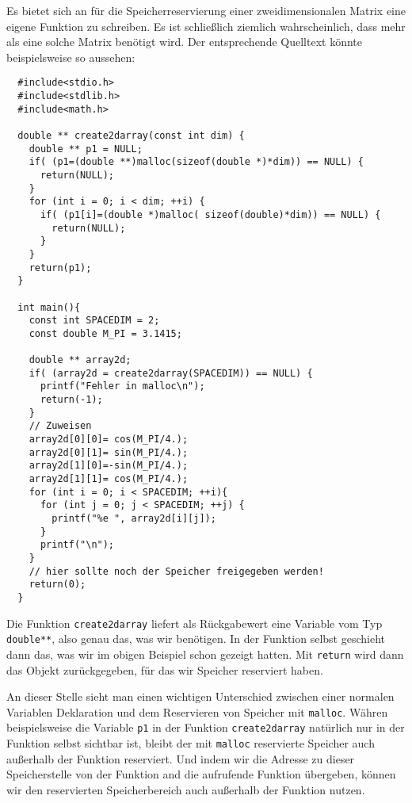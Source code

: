 Es bietet sich an für die Speicherreservierung einer zweidimensionalen Matrix eine eigene Funktion zu schreiben.
Es ist schließlich ziemlich wahrscheinlich, dass mehr als eine solche Matrix benötigt wird.
Der entsprechende Quelltext könnte beispielsweise so aussehen:
\begin{lstlisting}
  #include<stdio.h>
  #include<stdlib.h>
  #include<math.h>
  
  double ** create2darray(const int dim) {
    double ** p1 = NULL;
    if( (p1=(double **)malloc(sizeof(double *)*dim)) == NULL) {
      return(NULL);
    }
    for (int i = 0; i < dim; ++i) {
      if( (p1[i]=(double *)malloc( sizeof(double)*dim)) == NULL) {
        return(NULL);
      }
    }
    return(p1);
  }
  
  int main(){
    const int SPACEDIM = 2;
    const double M_PI = 3.1415;
    
    double ** array2d;
    if( (array2d = create2darray(SPACEDIM)) == NULL) {
      printf("Fehler in malloc\n");
      return(-1);
    }
    // Zuweisen
    array2d[0][0]= cos(M_PI/4.); 
    array2d[0][1]= sin(M_PI/4.); 
    array2d[1][0]=-sin(M_PI/4.); 
    array2d[1][1]= cos(M_PI/4.); 
    for (int i = 0; i < SPACEDIM; ++i){
      for (int j = 0; j < SPACEDIM; ++j) {
        printf("%e ", array2d[i][j]);
      }
      printf("\n");
    }
    // hier sollte noch der Speicher freigegeben werden!
    return(0);
  }
\end{lstlisting}
Die Funktion \verb|create2darray| liefert als Rückgabewert eine Variable vom Typ \verb|double**|, also genau das, was wir benötigen.
In der Funktion selbst geschieht dann das, was wir im obigen Beispiel schon gezeigt hatten.
Mit \verb|return| wird dann das Objekt zurückgegeben, für das wir Speicher reserviert haben.

An dieser Stelle sieht man einen wichtigen Unterschied zwischen einer normalen Variablen Deklaration und dem Reservieren von Speicher mit \verb|malloc|.
Währen beispielsweise die Variable \verb|p1| in der Funktion \verb|create2darray| natürlich nur in der Funktion selbst sichtbar ist, bleibt der mit \verb|malloc| reservierte Speicher auch außerhalb der Funktion reserviert.
Und indem wir die Adresse zu dieser Speicherstelle von der Funktion and die aufrufende Funktion übergeben, können wir den reservierten Speicherbereich auch außerhalb der Funktion nutzen.

